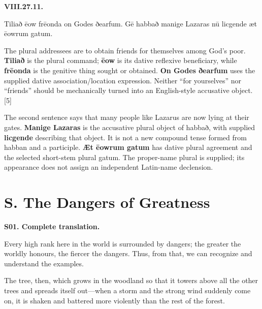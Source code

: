 \par\begin{minipage}{\linewidth}\raggedright
\textbf{VIII.27.11.}

Tiliað ēow frēonda on Godes ðearfum. Gē habbað manige Lazaras nū licgende æt ēowrum gatum.

The plural addressees are to obtain friends for themselves among God's poor. \textbf{Tiliað} is the plural command; \textbf{ēow} is its dative reflexive beneficiary, while \textbf{frēonda} is the genitive thing sought or obtained. \textbf{On Godes ðearfum} uses the supplied dative association/\allowbreak{}location expression. Neither “for yourselves” nor “friends” should be mechanically turned into an English-style accusative object. [5]

The second sentence says that many people like Lazarus are now lying at their gates. \textbf{Manige Lazaras} is the accusative plural object of habbað, with supplied \textbf{licgende} describing that object. It is not a new compound tense formed from habban and a participle. \textbf{Æt ēowrum gatum} has dative plural agreement and the selected short-stem plural gatum. The proper-name plural is supplied; its appearance does not assign an independent Latin-name declension.

\end{minipage}\par\addvspace{4pt}

\clearpage
\section*{S. The Dangers of Greatness}

\textbf{S01. Complete translation.}

Every high rank here in the world is surrounded by dangers; the greater the worldly honours, the fiercer the dangers. Thus, from that, we can recognize and understand the examples.

The tree, then, which grows in the woodland so that it towers above all the other trees and spreads itself out—when a storm and the strong wind suddenly come on, it is shaken and battered more violently than the rest of the forest.

